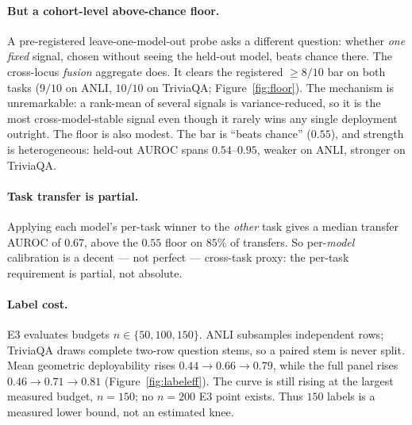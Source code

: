 \documentclass[11pt]{article}
\begin{document}
\paragraph{But a cohort-level above-chance floor.} A pre-registered leave-one-model-out probe asks a
different question: whether \emph{one fixed} signal, chosen without seeing the held-out model,
beats chance there. The cross-locus \emph{fusion} aggregate does. It clears the registered
$\geq 8/10$ bar on both tasks ($9/10$ on ANLI, $10/10$ on TriviaQA; Figure~\ref{fig:floor}). The
mechanism is unremarkable: a rank-mean of several signals is variance-reduced, so it is the most
cross-model-stable signal even though it rarely wins any single deployment outright. The floor is
also modest. The bar is ``beats chance'' ($0.55$), and strength is heterogeneous: held-out AUROC
spans $0.54$--$0.95$, weaker on ANLI, stronger on TriviaQA.


\paragraph{Task transfer is partial.} Applying each model's per-task winner to the \emph{other}
task gives a median transfer AUROC of $0.67$, above the $0.55$ floor on $85\%$ of transfers. So
per-\emph{model} calibration is a decent --- not perfect --- cross-task proxy: the per-task
requirement is partial, not absolute.

\paragraph{Label cost.} E3 evaluates budgets $n\in\{50,100,150\}$. ANLI subsamples independent rows; TriviaQA draws
complete two-row question stems, so a paired stem is never split. Mean geometric deployability
rises $0.44\rightarrow0.66\rightarrow0.79$, while the full panel rises
$0.46\rightarrow0.71\rightarrow0.81$ (Figure~\ref{fig:labeleff}). The curve is still rising at the
largest measured budget, $n=150$; no $n=200$ E3 point exists. Thus $150$ labels is a measured lower
bound, not an estimated knee.
\end{document}
